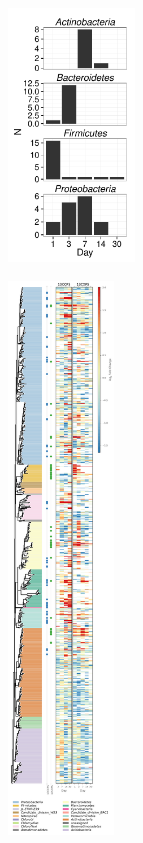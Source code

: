 \begin{figure}[H]
	\begin{center}
	\centerline{\includegraphics[width=0.30\textwidth]{figures/xylose_rspndr_bar/xylose_rspndr_bar.pdf}}
	\caption{\protect}\label{fig:xyl_count}
        \end{center}
\end{figure}

\begin{figure}[H]
	\begin{center}
	\centerline{\includegraphics[width=0.25\textwidth]{figures/bacteria_tree/bacteria_tree.pdf}}
	\caption{\protect}\label{fig:trees}
        \end{center}
\end{figure}

